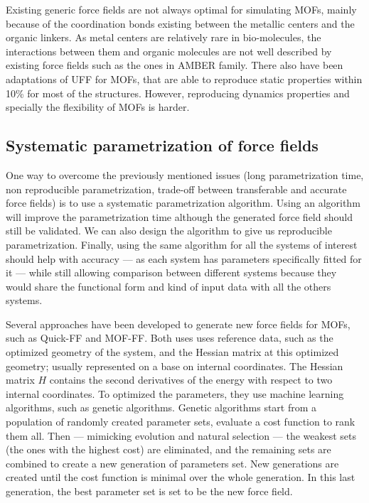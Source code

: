 \documentclass[thesis]{subfiles}
\begin{document}
Existing generic force fields are not always optimal for simulating MOFs, mainly
because of the coordination bonds existing between the metallic centers and the
organic linkers. As metal centers are relatively rare in bio-molecules, the
interactions between them and organic molecules are not well described by
existing force fields such as the ones in AMBER family. There also have been
adaptations of UFF for MOFs\cite{Addicoat2014, Coupry2016}, that are able to
reproduce static properties within 10\% for most of the structures. However,
reproducing dynamics properties and specially the flexibility of MOFs is harder.

\subsection{Systematic parametrization of force fields}

One way to overcome the previously mentioned issues (long parametrization time,
non reproducible parametrization, trade-off between transferable and accurate
force fields) is to use a systematic parametrization algorithm. Using an
algorithm will improve the parametrization time although the generated force
field should still be validated. We can also design the algorithm to give us
reproducible parametrization. Finally, using the same algorithm for all the
systems of interest should help with accuracy --- as each system has parameters
specifically fitted for it --- while still allowing comparison between different
systems because they would share the functional form and kind of input data with
all the others systems.

Several approaches have been developed to generate new force fields for MOFs,
such as Quick-FF\cite{Vanduyfhuys2015} and MOF-FF\cite{Bureekaew2013}. Both uses
uses \abinitio reference data, such as the optimized geometry of the system, and
the Hessian matrix at this optimized geometry; usually represented on a base on
internal coordinates. The Hessian matrix $H$ contains the second derivatives of
the energy with respect to two internal coordinates. To optimized the
parameters, they use machine learning algorithms, such as genetic algorithms.
Genetic algorithms start from a population of randomly created parameter sets,
evaluate a cost function to rank them all. Then --- mimicking evolution
and natural selection --- the weakest sets (the ones with the highest cost) are
eliminated, and the remaining sets are combined to create a new generation of
parameters set. New generations are created until the cost function is minimal
over the whole generation. In this last generation, the best parameter set is
set to be the new force field.
\end{document}
